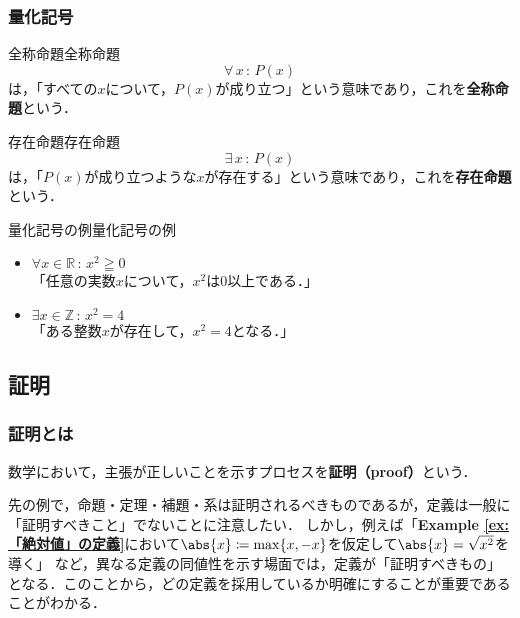 \documentclass[a4paper,11pt]{ltjsarticle}
\renewcommand{\emph}[1]{\textbf{#1}}
\newcommand{\exref}[1]{{\bfseries\sffamily Example \ref{ex:#1}}}
\renewcommand{\geq}{\geqq}
\begin{document}
    \subsubsection{量化記号}
    
    \begin{definition}{全称命題}{全称命題}
        \[
          \forall\, x \, : \, P(x)
        \]
        は，「すべての$x$について，$P(x)$が成り立つ」という意味であり，これを\emph{全称命題}という．
    \end{definition}
    
    \begin{definition}{存在命題}{存在命題}
        \[
        \exists \,  x\, : \, P(x)
        \]
        は，「$P(x)$が成り立つような$x$が存在する」という意味であり，これを\emph{存在命題}という．
    \end{definition}
    
    \begin{example}{量化記号の例}{量化記号の例}
        \begin{itemize}
            \item $\forall x \in \mathbb{R}\, : \, x^2 \geq 0$\\
            「任意の実数$x$について，$x^2$は$0$以上である．」
            \item $\exists x \in \mathbb{Z} \, : \, x^2 = 4$\\
            「ある整数$x$が存在して，$x^2 = 4$となる．」
        \end{itemize}
    \end{example}

    \subsection{証明}

    \subsubsection{証明とは}
    数学において，主張が正しいことを示すプロセスを\emph{証明（proof）}という．
    
    先の例で，命題・定理・補題・系は証明されるべきものであるが，定義は一般に「証明すべきこと」でないことに注意したい．
    しかし，例えば「\exref{「絶対値」の定義}において$\abs{x} \coloneqq \max \{ x, -x \}$を仮定して$\abs{x} = \sqrt{x^2}$を導く」
    など，異なる定義の同値性を示す場面では，定義が「証明すべきもの」となる．このことから，どの定義を採用しているか明確にすることが重要であることがわかる．
\end{document}

